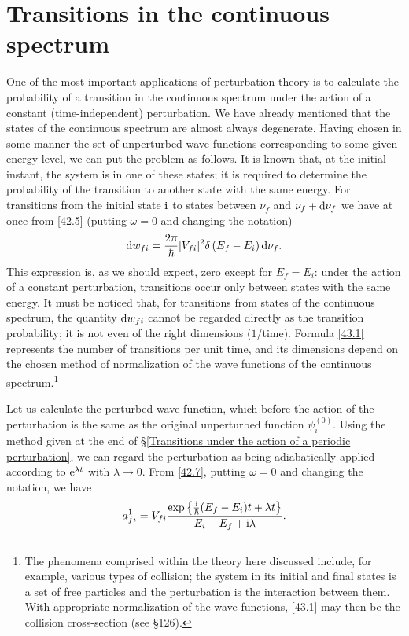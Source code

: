 \section{Transitions in the continuous spectrum}\label{Transitions in the continuous spectrum}
One of the most important applications of perturbation theory is to calculate the probability of a transition in the continuous spectrum under the action of a constant (time-independent) perturbation. We have already mentioned that the states of the continuous spectrum are almost always degenerate. Having chosen in some manner the set of unperturbed wave functions corresponding to some given energy level, we can put the problem as follows. It is known that, at the initial instant, the system is in one of these states; it is required to determine the probability of the transition to another state with the same energy. For transitions from the initial state $ \mathrm{i} $ to states between $ \nu_f $ and $ \nu_f + \mathrm{d}\nu_f $ we have at once from \eqref{42.5} (putting $ \omega = 0 $ and changing the notation)
\begin{equation}\label{43.1}
\mathrm{d} w_{fi}=\frac{2\uppi}{\hbar}|V_{fi}|^2\delta\left(E_f-E_i \right)\mathrm{d}\nu_f.
\end{equation}
This expression is, as we should expect, zero except for $ E_f = E_i $: under the action of a constant perturbation, transitions occur only between states with the same energy. It must be noticed that, for transitions from states of the continuous spectrum, the quantity $ \mathrm{d} w_{fi} $ cannot be regarded directly as the transition probability; it is not even of the right dimensions ($ 1 $/time). Formula \eqref{43.1} represents the number of transitions per unit time, and its dimensions depend on the chosen method of normalization of the wave functions of the continuous spectrum.\footnote{The phenomena comprised within the theory here discussed include, for example, various types of collision; the system in its initial and final states is a set of free particles and the perturbation is the interaction between them. With appropriate normalization of the wave functions, \eqref{43.1} may then be the collision cross-section (see \S126).
}

Let us calculate the perturbed wave function, which before the action of the perturbation is the same as the original unperturbed function $ \psi_i^{(0)} $. Using the method given at the end of \S\ref{Transitions under the action of a periodic perturbation}, we can regard the perturbation as being adiabatically applied according to $ \mathrm{e}^{\lambda t} $ with $ \lambda\to  0 $. From \eqref{42.7}, putting $ \omega = 0 $ and changing the notation, we have
\begin{equation}\label{43.2}
a_{fi}^{1}=V_{fi}\frac{\exp\left\{\frac{\mathrm{i}}{\hbar}(E_f-E_i)t+\lambda t\right\}}{E_i-E_f+\mathrm{i}\lambda}.
\end{equation}



